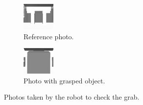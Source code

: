 \documentclass[a4paper, 10pt, conference]{ieeeconf}
\begin{document}
    \begin{figure}[!h]
        \centering
        \begin{subfigure}[b]{0.23\textwidth}
            \centering
            \includegraphics[width=\textwidth]{resources/png/photo-ref.png}
            \caption{Reference photo.}
        \end{subfigure}
        \hfill
        \begin{subfigure}[b]{0.23\textwidth}
            \centering
            \includegraphics[width=\textwidth]{resources/png/photo-grasp.png}
            \caption{Photo with grasped object.}
        \end{subfigure}
        \caption{Photos taken by the robot to check the grab.}
        \label{fig:manipulation.check.grasp}
    \end{figure}
    
\end{document}
